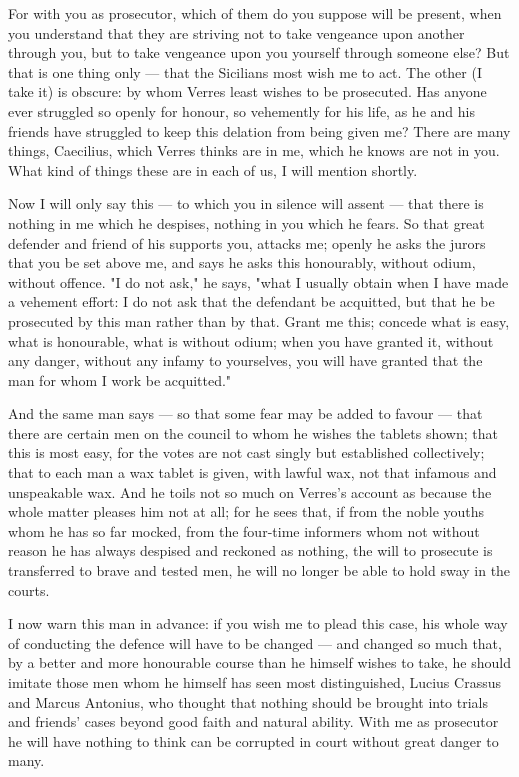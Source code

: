 For with you as prosecutor, which of them do you suppose will be present, when you understand that they are striving not to take vengeance upon another through you, but to take vengeance upon you yourself through someone else? But that is one thing only --- that the Sicilians most wish me to act. The other (I take it) is obscure: by whom Verres least wishes to be prosecuted. Has anyone ever struggled so openly for honour, so vehemently for his life, as he and his friends have struggled to keep this delation from being given me? There are many things, Caecilius, which Verres thinks are in me, which he knows are not in you. What kind of things these are in each of us, I will mention shortly.

 Now I will only say this --- to which you in silence will assent --- that there is nothing in me which he despises, nothing in you which he fears. So that great defender and friend of his supports you, attacks me; openly he asks the jurors that you be set above me, and says he asks this honourably, without odium, without offence. "I do not ask," he says, "what I usually obtain when I have made a vehement effort: I do not ask that the defendant be acquitted, but that he be prosecuted by this man rather than by that. Grant me this; concede what is easy, what is honourable, what is without odium; when you have granted it, without any danger, without any infamy to yourselves, you will have granted that the man for whom I work be acquitted."

 And the same man says --- so that some fear may be added to favour --- that there are certain men on the council to whom he wishes the tablets shown; that this is most easy, for the votes are not cast singly but established collectively; that to each man a wax tablet is given, with lawful wax, not that infamous and unspeakable wax. And he toils not so much on Verres's account as because the whole matter pleases him not at all; for he sees that, if from the noble youths whom he has so far mocked, from the four-time informers whom not without reason he has always despised and reckoned as nothing, the will to prosecute is transferred to brave and tested men, he will no longer be able to hold sway in the courts.

 I now warn this man in advance: if you wish me to plead this case, his whole way of conducting the defence will have to be changed --- and changed so much that, by a better and more honourable course than he himself wishes to take, he should imitate those men whom he himself has seen most distinguished, Lucius Crassus and Marcus Antonius, who thought that nothing should be brought into trials and friends' cases beyond good faith and natural ability. With me as prosecutor he will have nothing to think can be corrupted in court without great danger to many.

